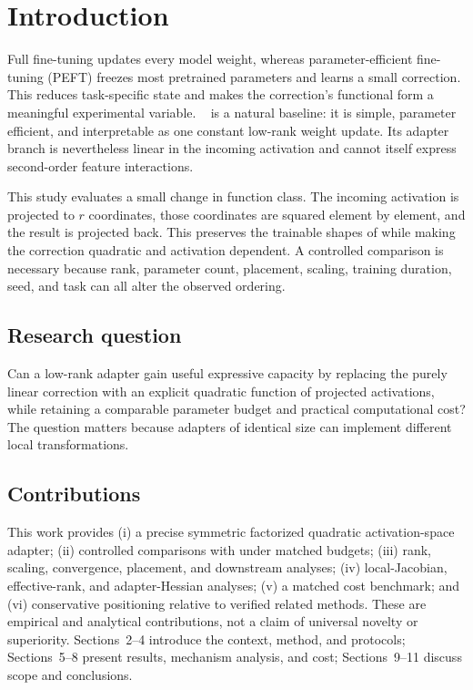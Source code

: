 \documentclass[11pt]{article}
\begin{document}
\section{Introduction}
Full fine-tuning updates every model weight, whereas parameter-efficient fine-tuning (PEFT) freezes most pretrained parameters and learns a small correction. This reduces task-specific state and makes the correction's functional form a meaningful experimental variable. \lora{}~\cite{hu2022lora} is a natural baseline: it is simple, parameter efficient, and interpretable as one constant low-rank weight update. Its adapter branch is nevertheless linear in the incoming activation and cannot itself express second-order feature interactions.

This study evaluates a small change in function class. The incoming activation is projected to $r$ coordinates, those coordinates are squared element by element, and the result is projected back. This preserves the trainable shapes of \lora{} while making the correction quadratic and activation dependent. A controlled comparison is necessary because rank, parameter count, placement, scaling, training duration, seed, and task can all alter the observed ordering.

\subsection{Research question}
Can a low-rank adapter gain useful expressive capacity by replacing the purely linear \lora{} correction with an explicit quadratic function of projected activations, while retaining a comparable parameter budget and practical computational cost? The question matters because adapters of identical size can implement different local transformations.

\subsection{Contributions}
This work provides (i) a precise symmetric factorized quadratic activation-space adapter; (ii) controlled comparisons with \lora{} under matched budgets; (iii) rank, scaling, convergence, placement, and downstream analyses; (iv) local-Jacobian, effective-rank, and adapter-Hessian analyses; (v) a matched cost benchmark; and (vi) conservative positioning relative to verified related methods. These are empirical and analytical contributions, not a claim of universal novelty or superiority. Sections~2--4 introduce the context, method, and protocols; Sections~5--8 present results, mechanism analysis, and cost; Sections~9--11 discuss scope and conclusions.
\end{document}
